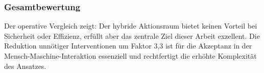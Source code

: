 \subsubsection*{Gesamtbewertung}
Der operative Vergleich zeigt: Der hybride Aktionsraum bietet keinen Vorteil bei Sicherheit oder Effizienz, erfüllt aber das zentrale Ziel dieser Arbeit exzellent. Die Reduktion unnötiger Interventionen um Faktor 3,3 ist für die Akzeptanz in der Mensch-Maschine-Interaktion essenziell und rechtfertigt die erhöhte Komplexität des Ansatzes.

